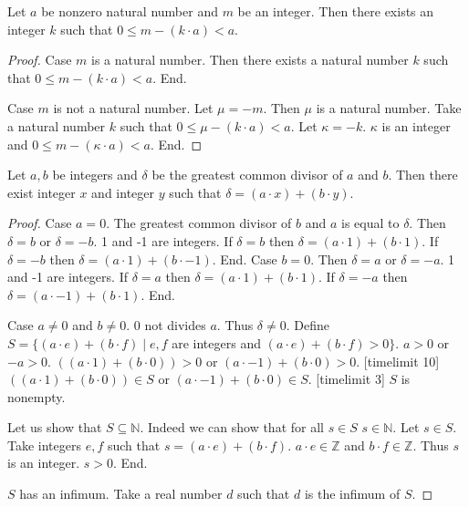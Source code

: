 \documentclass{article}
\begin{document}
\begin{forthel}
\begin{lemma}
Let $a$ be nonzero natural number and $m$ be an integer.
Then there exists an integer $k$ such that $0 \leq m - (k \cdot a) < a$.
\end{lemma}
\begin{proof}
Case $m$ is a natural number. Then there exists a natural number $k$ such that $0 \leq m - (k \cdot a) < a$. End.

Case $m$ is not a natural number. Let $\mu = -m$. Then $\mu$ is a natural number.
Take a natural number $k$ such that $0 \leq \mu - (k \cdot a) < a$. Let $\kappa = -k$. 
$\kappa$ is an integer and $0 \leq m - (\kappa \cdot a) < a$. End.
\end{proof}



\begin{theorem}[Bezout]
Let $a,b$ be integers and $\delta$ be the greatest common divisor of $a$ and $b$.
Then there exist integer $x$ and integer $y$ such that 
$\delta = (a \cdot x) + (b \cdot y)$. 
\end{theorem}
\begin{proof}
Case $a = 0$. The greatest common divisor of $b$ and $a$ is equal to $\delta$.
  Then $\delta = b$ or $\delta = -b$. 1 and -1 are integers. 
  If $\delta = b$ then $\delta = (a \cdot 1) + (b \cdot 1)$. If $\delta = -b$ then $\delta = (a \cdot 1) + (b \cdot -1)$. End. 
Case $b = 0$. Then $\delta = a$ or $\delta = -a$. 1 and -1 are integers. 
  If $\delta = a$ then $\delta = (a \cdot 1) + (b \cdot 1)$. If $\delta = -a$ then $\delta = (a \cdot -1) + (b \cdot 1)$. End. 

Case $a \neq  0$ and $b \neq 0$.
  $0$ not divides $a$. Thus $\delta \neq 0$.
  Define $S = \{ (a \cdot e) + (b \cdot f) \mid e,f$ are integers and 
  $(a \cdot e) + (b \cdot f) > 0\}$.
  $a > 0$ or $-a > 0$.
  $((a \cdot 1) + (b \cdot 0)) > 0$ or $(a \cdot -1) + (b \cdot 0) > 0$. 
  [timelimit 10] $((a \cdot 1) + (b \cdot 0)) \in S$ or $(a \cdot -1) + (b \cdot 0) \in S$. [timelimit 3]
  $S$ is nonempty.

  Let us show that $S \subseteq \mathbb{N}$.
    Indeed we can show that for all $s \in S$ $s \in \mathbb{N}$.
    Let $s \in S$.
    Take integers $e,f$ such that $s = (a \cdot e) + (b \cdot f)$. 
    $a \cdot e \in \mathbb{Z}$ and $b \cdot f \in \mathbb{Z}$. Thus $s$ is an integer.
    $s > 0$. 
  End.
    

  $S$ has an infimum.
  Take a real number $d$ such that $d$ is the infimum of $S$.


\end{proof}
\end{forthel}
\end{document}
